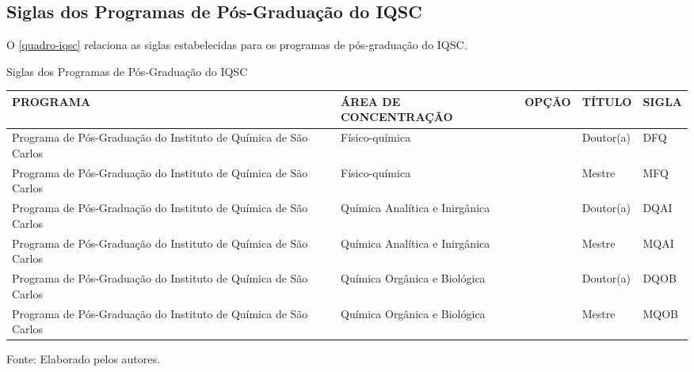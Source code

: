 \begin{apendicesenv}
\chapter{Siglas dos Programas de Pós-Graduação do IQSC}
O \autoref{quadro-iqsc} relaciona as siglas estabelecidas para os programas de pós-graduação do IQSC.
\begin{quadro}[htb]
\ABNTEXfontereduzida
\caption[Siglas dos Programas de Pós-Graduação do IQSC]{Siglas dos Programas de Pós-Graduação do IQSC}
\label{quadro-iqsc}
\begin{tabular}{|p{3.5cm}|p{3.5cm}|p{3.5cm}|p{1.5cm}|p{2.25cm}|}
  \hline
   \textbf{PROGRAMA} & \textbf{ÁREA DE CONCENTRAÇÃO} & \textbf{OPÇÃO} & \textbf{TÍTULO} & \textbf{SIGLA}  \\
    \hline
Programa de Pós-Graduação do Instituto de Química de São Carlos & Físico-química &  & Doutor(a) & DFQ\\
Programa de Pós-Graduação do Instituto de Química de São Carlos & Físico-química &  & Mestre & MFQ\\
Programa de Pós-Graduação do Instituto de Química de São Carlos & Química Analítica e Inirgânica &  & Doutor(a) & DQAI\\
Programa de Pós-Graduação do Instituto de Química de São Carlos & Química Analítica e Inirgânica &  & Mestre & MQAI\\
Programa de Pós-Graduação do Instituto de Química de São Carlos & Química Orgânica e Biológica &  & Doutor(a) & DQOB\\
Programa de Pós-Graduação do Instituto de Química de São Carlos & Química Orgânica e Biológica &  & Mestre & MQOB\\
\hline

\end{tabular}
\begin{flushleft}
		Fonte: Elaborado pelos autores.\
\end{flushleft}
\end{quadro}


\end{apendicesenv}

